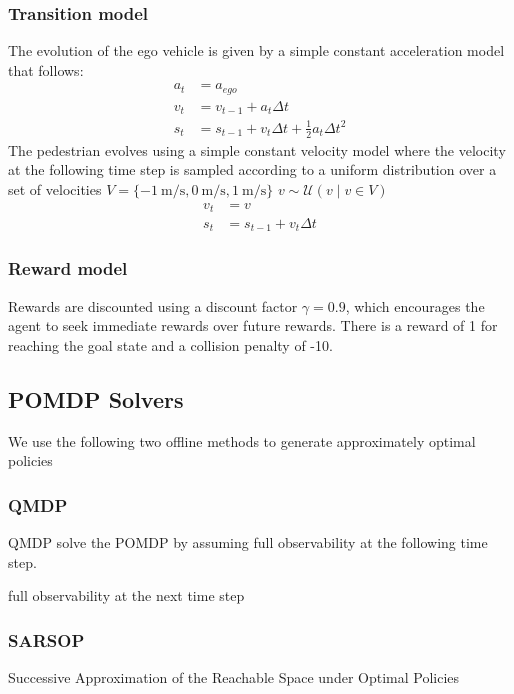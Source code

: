 \documentclass[conference]{IEEEtran}
\begin{document}
\subsubsection{Transition model} The evolution of the ego vehicle is given by a simple constant acceleration model that follows:
\begin{align}
    a_t &= a_{ego} \nonumber \\
    v_t &= v_{t-1} + a_t \Delta t \\
    s_t &= s_{t-1} + v_t \Delta t + \tfrac{1}{2} a_t \Delta t^2 \nonumber
\end{align}
The pedestrian evolves using a simple constant velocity model where the velocity at the following time step is sampled according to a uniform distribution over a set of velocities $V = \{-1~\si{\meter\per\second}, 0~\si{\meter\per\second}, 1~\si{\meter\per\second}\}$ $v \sim \mathcal{U}(v \mid v \in V)$
\begin{align}
    v_t &= v \nonumber \\
    s_t &= s_{t-1} + v_t \Delta t 
\end{align}

\subsubsection{Reward model} Rewards are discounted using a discount factor $\gamma = 0.9$, which encourages the agent to seek immediate rewards over future rewards. There is a reward of 1 for reaching the goal state and a collision penalty of -10. %

\subsection{POMDP Solvers}

We use the following two offline methods to generate approximately optimal policies

\subsubsection{QMDP}
QMDP solve the POMDP by assuming full observability at the following time step. \cite{Littman1995LearningUp}

full observability at the next time step

\subsubsection{SARSOP}
Successive Approximation of the Reachable Space under Optimal Policies 
\cite{Kurniawati2009SARSOP:Spaces}
\end{document}
